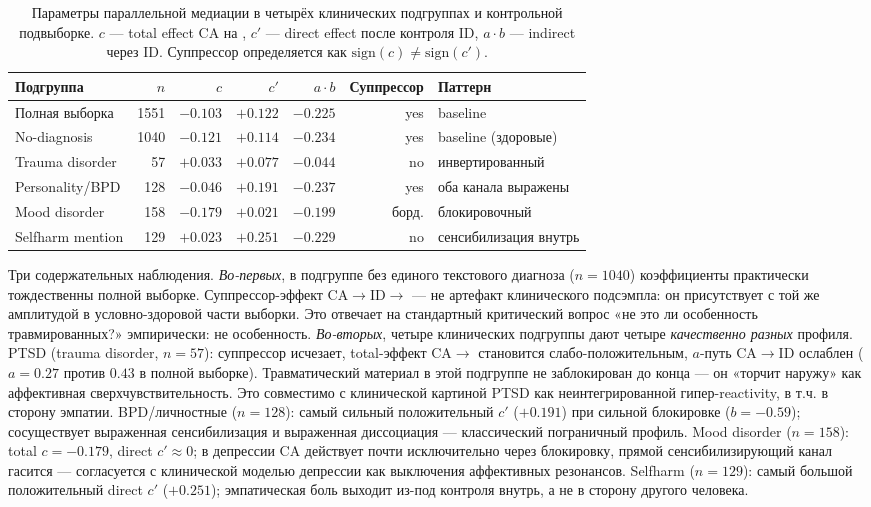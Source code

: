 \begin{table}[htbp]
\centering
\small
\caption[Четыре клинических паттерна канала CA$\to$ID$\to$\EAF{}]{Параметры параллельной медиации в четырёх клинических подгруппах и контрольной подвыборке. $c$ --- total effect CA на \EAF{}, $c'$ --- direct effect после контроля ID, $a \cdot b$ --- indirect через ID. Суппрессор определяется как $\mathrm{sign}(c) \neq \mathrm{sign}(c')$.}
\label{tab:clinical_subgroup_patterns}
\begin{tabular}{lrrrrrl}
\hline
Подгруппа & $n$ & $c$ & $c'$ & $a \cdot b$ & Суппрессор & Паттерн \\
\hline
Полная выборка & 1551 & $-0.103$ & $+0.122$ & $-0.225$ & yes & baseline \\
No-diagnosis & 1040 & $-0.121$ & $+0.114$ & $-0.234$ & yes & baseline (здоровые) \\
Trauma disorder & 57 & $+0.033$ & $+0.077$ & $-0.044$ & no & инвертированный \\
Personality/BPD & 128 & $-0.046$ & $+0.191$ & $-0.237$ & yes & оба канала выражены \\
Mood disorder & 158 & $-0.179$ & $+0.021$ & $-0.199$ & борд. & блокировочный \\
Selfharm mention & 129 & $+0.023$ & $+0.251$ & $-0.229$ & no & сенсибилизация внутрь \\
\hline
\end{tabular}
\end{table}

Три содержательных наблюдения. \emph{Во-первых}, в подгруппе без единого текстового диагноза ($n=1040$) коэффициенты практически тождественны полной выборке. Суппрессор-эффект CA$\to$ID$\to$\EAF{} --- не артефакт клинического подсэмпла: он присутствует с той же амплитудой в условно-здоровой части выборки. Это отвечает на стандартный критический вопрос «не это ли особенность травмированных?» эмпирически: не особенность. \emph{Во-вторых}, четыре клинических подгруппы дают четыре \emph{качественно разных} профиля. PTSD (trauma disorder, $n=57$): суппрессор исчезает, total-эффект CA$\to$\EAF{} становится слабо-положительным, $a$-путь $\mathrm{CA}\to\mathrm{ID}$ ослаблен ($a = 0.27$ против $0.43$ в полной выборке). Травматический материал в этой подгруппе не заблокирован до конца --- он «торчит наружу» как аффективная сверхчувствительность. Это совместимо с клинической картиной PTSD как неинтегрированной гипер-reactivity, в т.ч. в сторону эмпатии. BPD/личностные ($n=128$): самый сильный положительный $c'$ ($+0.191$) при сильной блокировке ($b = -0.59$); сосуществует выраженная сенсибилизация и выраженная диссоциация --- классический пограничный профиль. Mood disorder ($n=158$): total $c = -0.179$, direct $c' \approx 0$; в депрессии CA действует почти исключительно через блокировку, прямой сенсибилизирующий канал гасится --- согласуется с клинической моделью депрессии как выключения аффективных резонансов. Selfharm ($n=129$): самый большой положительный direct $c'$ ($+0.251$); эмпатическая боль выходит из-под контроля внутрь, а не в сторону другого человека.

